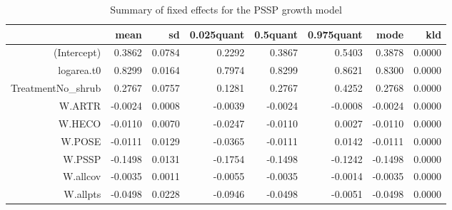 \begin{table}[ht]
\centering
\caption{Summary of fixed effects for the PSSP growth model} 
\label{PSSPgrowth}
\begin{tabular}{rrrrrrrr}
  \hline
 & mean & sd & 0.025quant & 0.5quant & 0.975quant & mode & kld \\ 
  \hline
(Intercept) & 0.3862 & 0.0784 & 0.2292 & 0.3867 & 0.5403 & 0.3878 & 0.0000 \\ 
  logarea.t0 & 0.8299 & 0.0164 & 0.7974 & 0.8299 & 0.8621 & 0.8300 & 0.0000 \\ 
  TreatmentNo\_shrub & 0.2767 & 0.0757 & 0.1281 & 0.2767 & 0.4252 & 0.2768 & 0.0000 \\ 
  W.ARTR & -0.0024 & 0.0008 & -0.0039 & -0.0024 & -0.0008 & -0.0024 & 0.0000 \\ 
  W.HECO & -0.0110 & 0.0070 & -0.0247 & -0.0110 & 0.0027 & -0.0110 & 0.0000 \\ 
  W.POSE & -0.0111 & 0.0129 & -0.0365 & -0.0111 & 0.0142 & -0.0111 & 0.0000 \\ 
  W.PSSP & -0.1498 & 0.0131 & -0.1754 & -0.1498 & -0.1242 & -0.1498 & 0.0000 \\ 
  W.allcov & -0.0035 & 0.0011 & -0.0055 & -0.0035 & -0.0014 & -0.0035 & 0.0000 \\ 
  W.allpts & -0.0498 & 0.0228 & -0.0946 & -0.0498 & -0.0051 & -0.0498 & 0.0000 \\ 
   \hline
\end{tabular}
\end{table}
